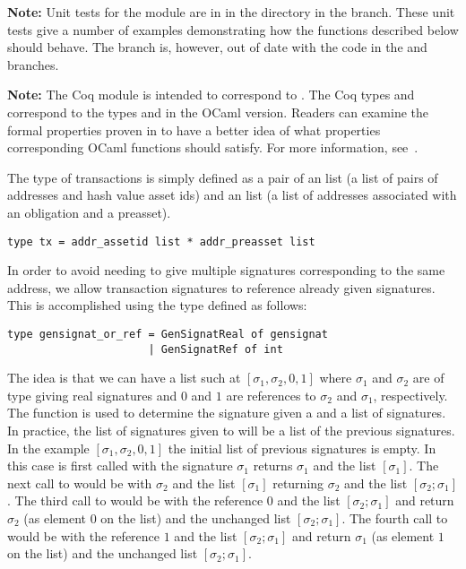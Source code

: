 {\bf{Note:}} Unit tests for the {} module are in {}
in the {}
directory in the {} branch.
These unit tests give a number of examples demonstrating how the functions described below should behave.
The {} branch is, however, out of date with the code in the {} and {} branches.

{\bf{Note:}} The Coq module {} is intended to correspond to {}.
The Coq types {} and {} correspond to the types {} and {} in the OCaml version.
Readers can examine the formal properties proven in {} to have a better
idea of what properties corresponding OCaml functions should satisfy.
For more information, see~\cite{White2015b}.

The type {} of transactions is simply defined as a pair of
an {} list (a list of pairs of addresses and hash value asset ids)
and an {} list (a list of addresses associated with an obligation and a preasset).
\begin{verbatim}
type tx = addr_assetid list * addr_preasset list
\end{verbatim}

In order to avoid needing to give multiple signatures corresponding to the same address,
we allow transaction signatures to reference already given signatures.
This is accomplished using the type {} defined as follows:
\begin{verbatim}
type gensignat_or_ref = GenSignatReal of gensignat
                      | GenSignatRef of int
\end{verbatim}
The idea is that we can have a list such at $[\sigma_1,\sigma_2,0,1]$
where $\sigma_1$ and $\sigma_2$ are of type {} giving real signatures
and $0$ and $1$ are references to $\sigma_2$ and $\sigma_1$, respectively.
The function {} is used to determine the signature given a {}
and a list of signatures.
In practice, the list of signatures given to {} will be a list of the
previous signatures.
In the example $[\sigma_1,\sigma_2,0,1]$ the initial list of previous signatures is empty.
In this case {} is first called with the signature $\sigma_1$ returns $\sigma_1$ and the list $[\sigma_1]$.
The next call to {} would be with $\sigma_2$ and the list $[\sigma_1]$
returning $\sigma_2$ and the list $[\sigma_2;\sigma_1]$.
The third call to {} would be with the reference $0$ and the list $[\sigma_2;\sigma_1]$
and return $\sigma_2$ (as element $0$ on the list) and the unchanged list $[\sigma_2;\sigma_1]$.
The fourth call to {} would be with the reference $1$ and the list $[\sigma_2;\sigma_1]$
and return $\sigma_1$ (as element $1$ on the list) and the unchanged list $[\sigma_2;\sigma_1]$.

